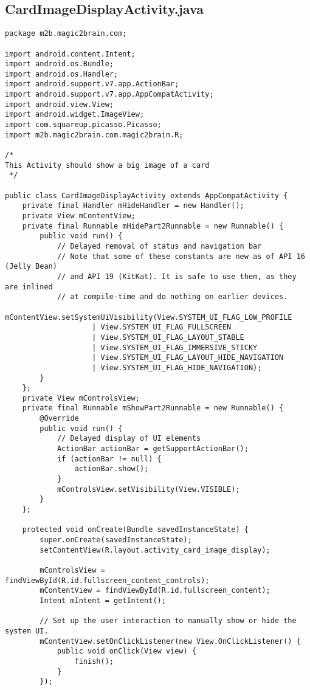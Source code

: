\subsection{CardImageDisplayActivity.java}
\begin{lstlisting}
package m2b.magic2brain.com;

import android.content.Intent;
import android.os.Bundle;
import android.os.Handler;
import android.support.v7.app.ActionBar;
import android.support.v7.app.AppCompatActivity;
import android.view.View;
import android.widget.ImageView;
import com.squareup.picasso.Picasso;
import m2b.magic2brain.com.magic2brain.R;

/*
This Activity should show a big image of a card
 */

public class CardImageDisplayActivity extends AppCompatActivity {
    private final Handler mHideHandler = new Handler();
    private View mContentView;
    private final Runnable mHidePart2Runnable = new Runnable() {
        public void run() {
            // Delayed removal of status and navigation bar
            // Note that some of these constants are new as of API 16 (Jelly Bean)
            // and API 19 (KitKat). It is safe to use them, as they are inlined
            // at compile-time and do nothing on earlier devices.
            mContentView.setSystemUiVisibility(View.SYSTEM_UI_FLAG_LOW_PROFILE
                    | View.SYSTEM_UI_FLAG_FULLSCREEN
                    | View.SYSTEM_UI_FLAG_LAYOUT_STABLE
                    | View.SYSTEM_UI_FLAG_IMMERSIVE_STICKY
                    | View.SYSTEM_UI_FLAG_LAYOUT_HIDE_NAVIGATION
                    | View.SYSTEM_UI_FLAG_HIDE_NAVIGATION);
        }
    };
    private View mControlsView;
    private final Runnable mShowPart2Runnable = new Runnable() {
        @Override
        public void run() {
            // Delayed display of UI elements
            ActionBar actionBar = getSupportActionBar();
            if (actionBar != null) {
                actionBar.show();
            }
            mControlsView.setVisibility(View.VISIBLE);
        }
    };

    protected void onCreate(Bundle savedInstanceState) {
        super.onCreate(savedInstanceState);
        setContentView(R.layout.activity_card_image_display);

        mControlsView = findViewById(R.id.fullscreen_content_controls);
        mContentView = findViewById(R.id.fullscreen_content);
        Intent mIntent = getIntent();

        // Set up the user interaction to manually show or hide the system UI.
        mContentView.setOnClickListener(new View.OnClickListener() {
            public void onClick(View view) {
                finish();
            }
        });


\end{lstlisting}
